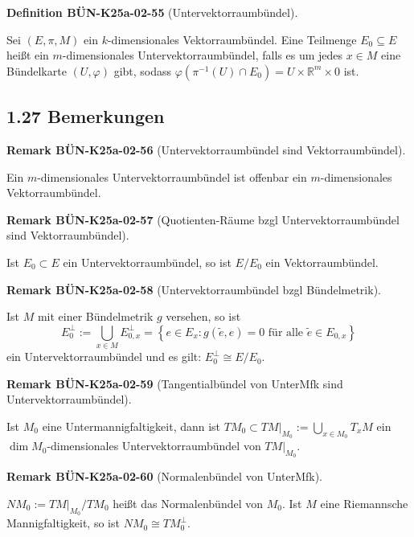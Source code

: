 \documentclass[10pt, letterpaper]{article}
\newcommand{\CustomHeading}[3]{%
  \par\medskip\noindent%
  \textbf{#1 #2} \textnormal{(#3)}.\enskip%
}
\newenvironment{DEF}[2]{\begin{unitbox}\CustomHeading{Definition}{#1}{#2}}{\end{unitbox}}
\newenvironment{REM}[2]{\begin{unitbox}\CustomHeading{Remark}{#1}{#2}}{\end{unitbox}}
\begin{document}
\begin{DEF}{BÜN-K25a-02-55}{Untervektorraumbündel}
Sei $(E, \pi, M)$ ein $k$-dimensionales Vektorraumbündel. Eine Teilmenge $E_{0} \subseteq E$ heißt ein $m$-dimensionales Untervektorraumbündel, falls es um jedes $x \in M$ eine Bündelkarte $(U, \varphi)$ gibt, sodass $\varphi\left(\pi^{-1}(U) \cap E_{0}\right)=U \times \mathbb{R}^{m} \times 0$ ist.
\end{DEF}

\subsection*{1.27 Bemerkungen}


\begin{REM}{BÜN-K25a-02-56}{Untervektorraumbündel sind Vektorraumbündel}
Ein $m$-dimensionales Untervektorraumbündel ist offenbar ein $m$-dimensionales Vektorraumbündel.
\end{REM}


\begin{REM}{BÜN-K25a-02-57}{Quotienten-Räume bzgl Untervektorraumbündel sind Vektorraumbündel}
Ist $E_{0} \subset E$ ein Untervektorraumbündel, so ist $E / E_{0}$ ein Vektorraumbündel.
\end{REM}

\begin{REM}{BÜN-K25a-02-58}{Untervektorraumbündel bzgl Bündelmetrik}
Ist $M$ mit einer Bündelmetrik $g$ versehen, so ist
$$
E_{0}^{\perp}:=\bigcup_{x \in M} E_{0, x}^{\perp}=\left\{e \in E_{x}: g(\tilde{e}, e)=0 \text { für alle } \tilde{e} \in E_{0, x}\right\}
$$
ein Untervektorraumbündel und es gilt: $E_{0}^{\perp} \cong E / E_{0}$.
\end{REM}




\begin{REM}{BÜN-K25a-02-59}{Tangentialbündel von UnterMfk sind Untervektorraumbündel}
Ist $M_{0}$ eine Untermannigfaltigkeit, dann ist $\left.T M_{0} \subset T M\right|_{M_{0}}:=\bigcup_{x \in M_{0}} T_{x} M$ ein $\operatorname{dim} M_{0}$-dimensionales Untervektorraumbündel von $\left.T M\right|_{M_{0}}$.
\end{REM}

\begin{REM}{BÜN-K25a-02-60}{Normalenbündel von UnterMfk}
$N M_{0}:=\left.T M\right|_{M_{0}} / T M_{0}$ heißt das Normalenbündel von $M_{0}$. Ist $M$ eine Riemannsche Mannigfaltigkeit, so ist $N M_{0} \cong T M_{0}^{\perp}$.
\end{REM}
\end{document}
